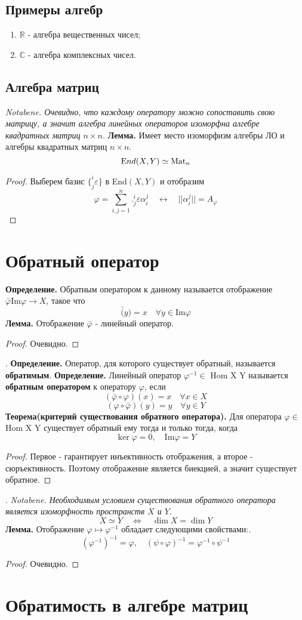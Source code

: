 \documentclass{article}
\newcommand*{\lemma}[1]{\textbf{Лемма.} #1. \newline}
\newcommand*{\theorem}[2]{\textbf{Теорема#1. } #2 \newline}
\newcommand*{\notabene}[1]{\textit{Notabene. #1.} \newline}
\newcommand*{\definition}[1]{\textbf{Определение.} #1 \newline}
\begin{document}
\subsection{Примеры алгебр}
\begin{enumerate}
    \item $\mathbb{R}$ - алгебра вещественных чисел;
    \item $\mathbb{C}$ - алгебра комплексных чисел.
\end{enumerate}
\subsection{Алгебра матриц}
\notabene{Очевидно, что каждому оператору можно сопоставить свою матрицу, а значит алгебра линейных операторов изоморфна алгебре квадратных матриц $n \times n$}
\newline 
\lemma{Имеет место изоморфизм алгебры ЛО и алгебры квадратных матриц $n \times n$}
$$
    \text End(X, Y) \simeq \text{Mat}_n
$$
\begin{proof}
    Выберем базис $\{ ^i_j \varepsilon \}$ в End$(X, Y)$ и отобразим
    $$
        \varphi = \sum_{i, j = 1}^{n} .^i_j \varepsilon \alpha^j_i \quad \leftrightarrow \quad ||\alpha^j_i|| = A_\varphi
    $$
\end{proof}
\section{Обратный оператор}
\definition{Обратным оператором к данному называется отображение $\bar \varphi \text{Im}\varphi \to X$, такое что}
$$
    \bar(y) = x \quad \forall y \in \text{Im}\varphi
$$
\lemma{Отображение $\bar{\varphi}$ - линейный оператор}
\begin{proof}
    Очевидно.
\end{proof}
.\newline
\definition{Оператор, для которого существует обратный, называется \textbf{обратимым}.}
\newline 
\definition{Линейный оператор $\varphi ^ {-1} \in$ Hom X Y называется \textbf{обратным оператором} к оператору $\varphi$, если}
$$
    (\bar{\varphi} \circ \varphi)(x) = x \quad \forall x \in X
$$
$$
    (\varphi \circ \bar{\varphi})(y) = y \quad \forall y \in Y
$$
\theorem{(критерий существования обратного оператора)}{Для оператора $\varphi \in$ Hom X Y существует обратный ему тогда и только тогда, когда}
$$
    \ker \varphi = {0}, \quad \text{Im}\varphi = Y
$$
\begin{proof}
    Первое - гарантирует инъективность отображения, а второе - сюръективность. Поэтому отображение является биекцией, а значит существует обратное.
\end{proof}
.\newline 
\notabene{Необходимым условием существования обратного оператора является изоморфность пространств $X$ и $Y$}
$$
    X \simeq Y \quad \Leftrightarrow \quad \dim X = \dim Y
$$
\lemma{Отображение $\varphi \mapsto \varphi^{-1}$ обладает следующими свойствами:}
$$
    (\varphi^{-1})^{-1} = \varphi, \quad (\psi \circ \varphi)^{-1} = \varphi^{-1} \circ \psi ^{-1}
$$
\begin{proof}
    Очевидно.
\end{proof}
\section{Обратимость в алгебре матриц}
\end{document}
